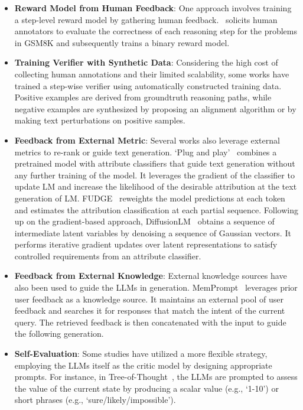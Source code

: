 \documentclass[a4paper,oneside]{book}
\begin{document}
\begin{itemize}
  \item \textbf{Reward Model from Human Feedback}: One approach involves training a step-level reward model by gathering human feedback.~\cite{uesato2022solving} solicits human annotators to evaluate the correctness of each reasoning step for the problems in GSM8K and subsequently trains a binary reward model.

  \item \textbf{Training Verifier with Synthetic Data}: Considering the high cost of collecting human annotations and their limited scalability, some works have trained a step-wise verifier using automatically constructed training data. Positive examples are derived from groundtruth reasoning paths, while negative examples are synthesized by proposing an alignment algorithm or by making text perturbations on positive samples.

  \item \textbf{Feedback from External Metric}: Several works also leverage external metrics to re-rank or guide text generation. `Plug and play'~\cite{dathathri2020plug} combines a pretrained model with attribute classifiers that guide text generation without any further training of the model. It leverages the gradient of the classifier to update LM and increase the likelihood of the desirable attribution at the text generation of LM. FUDGE~\cite{yang2021fudge} reweights the model predictions at each token and estimates the attribution classification at each partial sequence. Following up on the gradient-based approach, DiffusionLM~\cite{li2022diffusionlm} obtains a sequence of intermediate latent variables by denoising a sequence of Gaussian vectors. It performs iterative gradient updates over latent representations to satisfy controlled requirements from an attribute classifier.

  \item \textbf{Feedback from External Knowledge}: External knowledge sources have also been used to guide the LLMs in generation. MemPrompt~\cite{madaan2022memory} leverages prior user feedback as a knowledge source. It maintains an external pool of user feedback and searches it for responses that match the intent of the current query. The retrieved feedback is then concatenated with the input to guide the following generation.

  \item \textbf{Self-Evaluation}: Some studies have utilized a more flexible strategy, employing the LLMs itself as the critic model by designing appropriate prompts. For instance, in Tree-of-Thought~\cite{yao2023tree}, the LLMs are prompted to assess the value of the current state by producing a scalar value (e.g., `1-10') or short phrases (e.g., `sure/likely/impossible').
\end{itemize}
\end{document}
